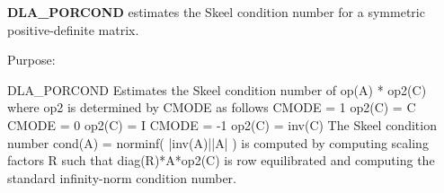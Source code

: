 {\bfseries D\+L\+A\+\_\+\+P\+O\+R\+C\+O\+N\+D} estimates the Skeel condition number for a symmetric positive-\/definite matrix. 

 \begin{DoxyParagraph}{Purpose\+: }
\begin{DoxyVerb}    DLA_PORCOND Estimates the Skeel condition number of  op(A) * op2(C)
    where op2 is determined by CMODE as follows
    CMODE =  1    op2(C) = C
    CMODE =  0    op2(C) = I
    CMODE = -1    op2(C) = inv(C)
    The Skeel condition number  cond(A) = norminf( |inv(A)||A| )
    is computed by computing scaling factors R such that
    diag(R)*A*op2(C) is row equilibrated and computing the standard
    infinity-norm condition number.\end{DoxyVerb}
 
\end{DoxyParagraph}


